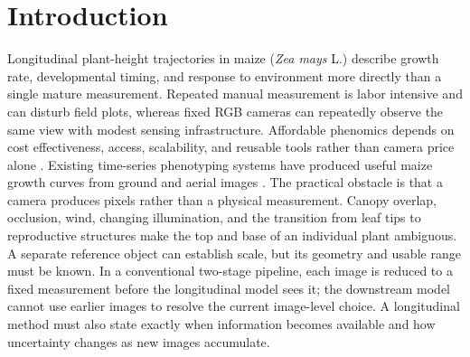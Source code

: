 \documentclass[12pt,letterpaper]{article}
\let\cite\parencite
\begin{document}
\begin{abstract}
Fixed cameras could make repeated field phenotyping more accessible, but occlusion and uncertain pixel-to-length calibration can corrupt individual-image measurements. We developed a Bayesian longitudinal maize (\textit{Zea mays} L.) height method in which predictions from earlier images guide current-image association and candidate selection before a measurement is finalized. Physical references convert image extents to centimeters, and a robust particle filter updates height, growth, and uncertainty using only images available through each time point. Independent 2021 validation comprised 132 manual heights from 33 plants in 12 camera rows; manual heights were excluded from fitting and tuning. Among six causal estimators, the particle filter gave the lowest mean absolute error (10.97 cm) and improved on exponentially weighted moving average, running median, and Holt by 4.01, 7.80, and 3.08 cm, with row-cluster intervals above zero. Improvements over single-frame and Gaussian filtering were 1.06 and 0.66 cm and were uncertain. Posterior 95\% intervals covered 94.7\% of manual heights. In simulated candidate ambiguity, using the prior during image analysis reduced latent-height root mean squared error from 10.5 to 6.0 cm; a matched real-image audit contained no candidate conflict. The method provides an open, physically calibrated workflow for longitudinal maize phenotyping and shows how temporal predictions can inform image analysis before measurement extraction.
\end{abstract}

\section{Introduction}

Longitudinal plant-height trajectories in maize (\textit{Zea mays} L.) describe growth rate, developmental timing, and response to environment more directly than a single mature measurement. Repeated manual measurement is labor intensive and can disturb field plots, whereas fixed RGB cameras can repeatedly observe the same view with modest sensing infrastructure. Affordable phenomics depends on cost effectiveness, access, scalability, and reusable tools rather than camera price alone \cite{hoyosvillegas2025affordable}. Existing time-series phenotyping systems have produced useful maize growth curves from ground and aerial images \cite{ge2016temporal,liang2018timeseries,wang2020functional,rodene2022uav}. The practical obstacle is that a camera produces pixels rather than a physical measurement. Canopy overlap, occlusion, wind, changing illumination, and the transition from leaf tips to reproductive structures make the top and base of an individual plant ambiguous. A separate reference object can establish scale, but its geometry and usable range must be known. In a conventional two-stage pipeline, each image is reduced to a fixed measurement before the longitudinal model sees it; the downstream model cannot use earlier images to resolve the current image-level choice. A longitudinal method must also state exactly when information becomes available and how uncertainty changes as new images accumulate.
\end{document}
